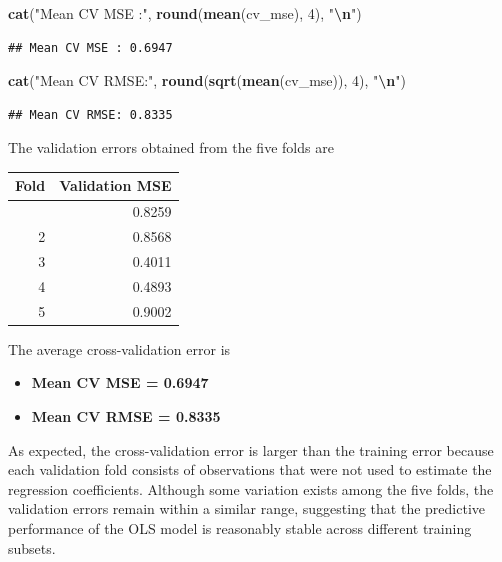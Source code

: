 \documentclass[
  11pt,
]{article}
\newenvironment{Shaded}{\begin{snugshade}}{\end{snugshade}}
\newcommand{\DecValTok}[1]{\textcolor[rgb]{0.00,0.00,0.81}{#1}}
\newcommand{\FunctionTok}[1]{\textcolor[rgb]{0.13,0.29,0.53}{\textbf{#1}}}
\newcommand{\NormalTok}[1]{#1}
\newcommand{\SpecialCharTok}[1]{\textcolor[rgb]{0.81,0.36,0.00}{\textbf{#1}}}
\newcommand{\StringTok}[1]{\textcolor[rgb]{0.31,0.60,0.02}{#1}}
\newcounter{none} %
\providecommand{\tightlist}{%
  \setlength{\itemsep}{0pt}\setlength{\parskip}{0pt}}
\begin{document}
\begin{Shaded}
\begin{Highlighting}[]
\FunctionTok{cat}\NormalTok{(}\StringTok{"Mean CV MSE :"}\NormalTok{, }\FunctionTok{round}\NormalTok{(}\FunctionTok{mean}\NormalTok{(cv\_mse), }\DecValTok{4}\NormalTok{), }\StringTok{"}\SpecialCharTok{\textbackslash{}n}\StringTok{"}\NormalTok{)}
\end{Highlighting}
\end{Shaded}

\begin{verbatim}
## Mean CV MSE : 0.6947
\end{verbatim}

\begin{Shaded}
\begin{Highlighting}[]
\FunctionTok{cat}\NormalTok{(}\StringTok{"Mean CV RMSE:"}\NormalTok{, }\FunctionTok{round}\NormalTok{(}\FunctionTok{sqrt}\NormalTok{(}\FunctionTok{mean}\NormalTok{(cv\_mse)), }\DecValTok{4}\NormalTok{), }\StringTok{"}\SpecialCharTok{\textbackslash{}n}\StringTok{"}\NormalTok{)}
\end{Highlighting}
\end{Shaded}

\begin{verbatim}
## Mean CV RMSE: 0.8335
\end{verbatim}

The validation errors obtained from the five folds are

{\def\LTcaptype{none} %
\begin{longtable}[]{@{}rr@{}}
\toprule\noalign{}
Fold & Validation MSE \\
\midrule\noalign{}
\endhead
\bottomrule\noalign{}
\endlastfoot
1 & 0.8259 \\
2 & 0.8568 \\
3 & 0.4011 \\
4 & 0.4893 \\
5 & 0.9002 \\
\end{longtable}
}

The average cross-validation error is

\begin{itemize}
\tightlist
\item
  \textbf{Mean CV MSE = 0.6947}
\item
  \textbf{Mean CV RMSE = 0.8335}
\end{itemize}

As expected, the cross-validation error is larger than the training
error because each validation fold consists of observations that were
not used to estimate the regression coefficients. Although some
variation exists among the five folds, the validation errors remain
within a similar range, suggesting that the predictive performance of
the OLS model is reasonably stable across different training subsets.
\end{document}
